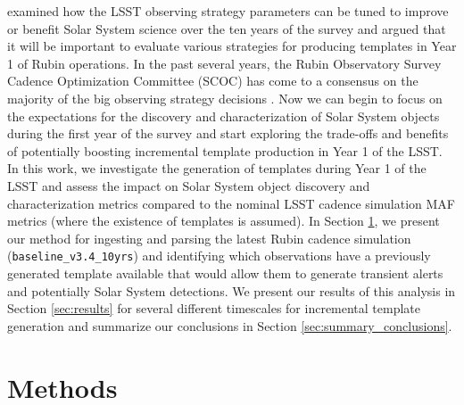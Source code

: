 \documentclass[preprint,linenumbers]{aastex631}
\newcommand{\baselinefull}{\texttt{baseline\_v3.4\_10yrs}\xspace}
\begin{document}
	\cite{schwambTuningLegacySurvey2023} examined how the LSST observing strategy parameters can be tuned to improve or benefit Solar System science over the ten years of the survey and argued that  it will be important to evaluate various strategies for producing templates in Year 1 of Rubin operations. In the past several years, the Rubin Observatory Survey Cadence Optimization Committee (SCOC)  has come to a consensus on the majority of the big observing strategy decisions \citep{SCOC_Report_1, SCOC_Report_2}. Now we can begin to focus on the expectations for the discovery and characterization of Solar System objects during the first year of the survey and start exploring the trade-offs and benefits of potentially boosting incremental template production in Year 1 of the LSST. In this work, we investigate the generation of templates during Year 1 of the LSST and assess the impact on Solar System object discovery and characterization metrics compared to the nominal LSST cadence simulation MAF metrics  (where the existence of templates is assumed). In Section \ref{sec:methods}, we present our method for ingesting and parsing the latest Rubin cadence simulation (\baselinefull) and identifying which observations have a previously generated template available that would allow them to generate transient alerts and potentially Solar System detections. We present our results of this analysis in Section \ref{sec:results} for several different timescales for incremental template generation and summarize our conclusions in Section \ref{sec:summary_conclusions}.  
	
	\section{Methods}
	\label{sec:methods}
\end{document}
